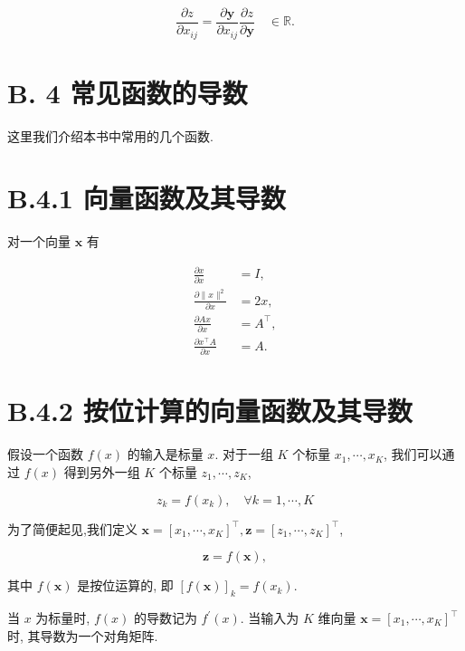 \documentclass[10pt]{article}
\begin{document}
\begin{equation*}
\frac{\partial z}{\partial x_{i j}}=\frac{\partial \boldsymbol{y}}{\partial x_{i j}} \frac{\partial z}{\partial \boldsymbol{y}} \quad \in \mathbb{R} . \tag{B.18}
\end{equation*}


\section*{B. 4 常见函数的导数}
这里我们介绍本书中常用的几个函数.

\section*{B.4.1 向量函数及其导数}
对一个向量 $\boldsymbol{x}$ 有


\begin{align*}
\frac{\partial x}{\partial x} & =I,  \tag{B.19}\\
\frac{\partial\|x\|^{2}}{\partial x} & =2 x,  \tag{B.20}\\
\frac{\partial A x}{\partial x} & =A^{\top},  \tag{B.21}\\
\frac{\partial x^{\top} A}{\partial x} & =A . \tag{B.22}
\end{align*}


\section*{B.4.2 按位计算的向量函数及其导数}
假设一个函数 $f(x)$ 的输入是标量 $x$. 对于一组 $K$ 个标量 $x_{1}, \cdots, x_{K}$, 我们可以通过 $f(x)$ 得到另外一组 $K$ 个标量 $z_{1}, \cdots, z_{K}$,


\begin{equation*}
z_{k}=f\left(x_{k}\right), \quad \forall k=1, \cdots, K \tag{B.23}
\end{equation*}


为了简便起见,我们定义 $\boldsymbol{x}=\left[x_{1}, \cdots, x_{K}\right]^{\top}, \boldsymbol{z}=\left[z_{1}, \cdots, z_{K}\right]^{\top}$,


\begin{equation*}
\boldsymbol{z}=f(\boldsymbol{x}), \tag{B.24}
\end{equation*}


其中 $f(\boldsymbol{x})$ 是按位运算的, 即 $[f(\boldsymbol{x})]_{k}=f\left(x_{k}\right)$.

当 $x$ 为标量时, $f(x)$ 的导数记为 $f^{\prime}(x)$. 当输入为 $K$ 维向量 $\boldsymbol{x}=\left[x_{1}, \cdots, x_{K}\right]^{\top}$时, 其导数为一个对角矩阵.
\end{document}
